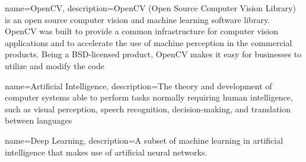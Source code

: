 
{
	name={OpenCV},
	description={OpenCV (Open Source Computer Vision Library) is an open source computer vision and machine learning software library. OpenCV was built to provide a common infrastructure for computer vision applications and to accelerate the use of machine perception in the commercial products. Being a BSD-licensed product, OpenCV makes it easy for businesses to utilize and modify the code} \cite{About_OpenCv}
}

{
	name={Artificial Intelligence},
	description={The theory and development of computer systems able to perform tasks normally requiring human intelligence, such as visual perception, speech recognition, decision-making, and translation between languages}
}

{
	name={Deep Learning},
	description={A subset of machine learning in artificial intelligence that makes use of artificial neural networks.}
}



